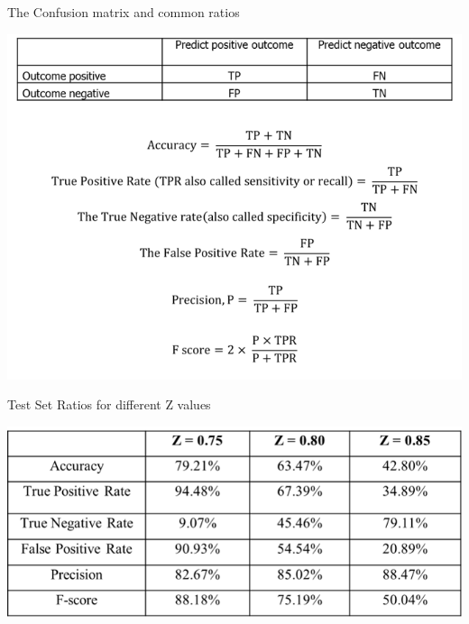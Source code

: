 \documentclass[11pt]{beamer}
\begin{document}
\begin{frame}{The Confusion matrix and common ratios}
	\begin{center}
	\includegraphics[scale=0.5]{../05-pictures/lesson-3-1_pic_13.png}
	\end{center}
\end{frame}
\begin{frame}{Test Set Ratios for different Z values}
	 
	\begin{center}
	\includegraphics[scale=0.5]{../05-pictures/lesson-3-1_pic_14.png}
	\end{center}
\end{frame}
\end{document}
